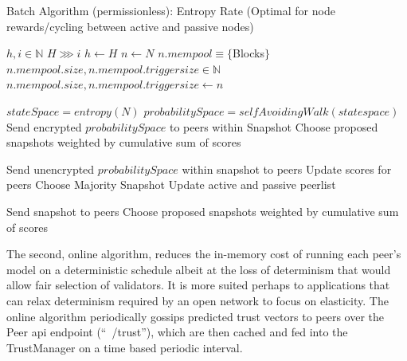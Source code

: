 \documentclass{article}
\begin{document}
\begin{algorithm}
\caption{Batch Algorithm (permissionless): Entropy Rate (Optimal for node rewards/cycling between active and passive nodes)}\label{alg:cap}
\begin{algorithmic}
\State $h, i \in \mathbb{N}$
\State $H \ggg  i$
\State $h \gets H$
\State $n \gets N$ 
\State $n.mempool \equiv \{ $Blocks$ \}$
\State $n.mempool.size, n.mempool.triggersize \in \mathbb{N}$
\State  $n.mempool.size, n.mempool.triggersize \gets n$ 

    		\State $stateSpace = entropy(N)$ 
   	 	\State $probabilitySpace = selfAvoidingWalk (state space)$  
   	 	\State Send encrypted $probabilitySpace$ to peers within Snapshot
    		\State Choose proposed snapshots weighted by cumulative sum of scores

    			\State Send unencrypted $probabilitySpace$ within snapshot to peers
   				 	\State Update scores for peers
					 \State Choose Majority Snapshot
					 \State Update active and passive peerlist
				\EndFor
			\EndIf
		
		
	    		\State Send snapshot to peers
	    		\State Choose proposed snapshots weighted by cumulative sum of scores
		
		
	\EndIf
\EndFor
\end{algorithmic}
\end{algorithm}

The second, online algorithm, reduces the in-memory cost of running each peer’s model on a deterministic schedule albeit at the loss of determinism that would allow fair selection of validators. It is more suited perhaps to applications that can relax determinism required by an open network to focus on elasticity. The online algorithm periodically gossips predicted trust vectors to peers over the Peer api endpoint (“~/trust”), which are then cached and fed into the TrustManager on a time based periodic interval.
\end{document}
